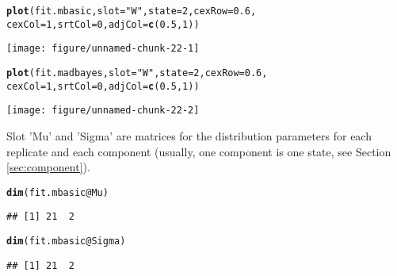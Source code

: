 \documentclass[a4paper,10pt]{article}\usepackage[]{graphicx}\usepackage[]{color}
\makeatletter
\def\maxwidth{ %
  \ifdim\Gin@nat@width>\linewidth
    \linewidth
  \else
    \Gin@nat@width
  \fi
}
\newcommand{\hlnum}[1]{\textcolor[rgb]{0.686,0.059,0.569}{#1}}%
\newcommand{\hlstr}[1]{\textcolor[rgb]{0.192,0.494,0.8}{#1}}%
\newcommand{\hlopt}[1]{\textcolor[rgb]{0,0,0}{#1}}%
\newcommand{\hlstd}[1]{\textcolor[rgb]{0.345,0.345,0.345}{#1}}%
\newcommand{\hlkwc}[1]{\textcolor[rgb]{0.333,0.667,0.333}{#1}}%
\newcommand{\hlkwd}[1]{\textcolor[rgb]{0.737,0.353,0.396}{\textbf{#1}}}%
\newenvironment{kframe}{%
 \def\at@end@of@kframe{}%
 \ifinner\ifhmode%
  \def\at@end@of@kframe{\end{minipage}}%
  \begin{minipage}{\columnwidth}%
 \fi\fi%
 \def\FrameCommand##1{\hskip\@totalleftmargin \hskip-\fboxsep
 \colorbox{shadecolor}{##1}\hskip-\fboxsep
     \hskip-\linewidth \hskip-\@totalleftmargin \hskip\columnwidth}%
 \MakeFramed {\advance\hsize-\width
   \@totalleftmargin\z@ \linewidth\hsize
   \@setminipage}}%
 {\par\unskip\endMakeFramed%
 \at@end@of@kframe}
\newenvironment{knitrout}{}{} %
\makeatother
\begin{document}
\begin{knitrout}
\color{fgcolor}\begin{kframe}
\begin{alltt}
\hlkwd{plot}\hlstd{(fit.mbasic,} \hlkwc{slot} \hlstd{=} \hlstr{"W"}\hlstd{,} \hlkwc{state} \hlstd{=} \hlnum{2}\hlstd{,} \hlkwc{cexRow} \hlstd{=} \hlnum{0.6}\hlstd{,}
    \hlkwc{cexCol} \hlstd{=} \hlnum{1}\hlstd{,} \hlkwc{srtCol} \hlstd{=} \hlnum{0}\hlstd{,} \hlkwc{adjCol} \hlstd{=} \hlkwd{c}\hlstd{(}\hlnum{0.5}\hlstd{,} \hlnum{1}\hlstd{))}
\end{alltt}
\end{kframe}

{\centering \texttt{[image: figure/unnamed-chunk-22-1]} 

}


\begin{kframe}\begin{alltt}
\hlkwd{plot}\hlstd{(fit.madbayes,} \hlkwc{slot} \hlstd{=} \hlstr{"W"}\hlstd{,} \hlkwc{state} \hlstd{=} \hlnum{2}\hlstd{,} \hlkwc{cexRow} \hlstd{=} \hlnum{0.6}\hlstd{,}
    \hlkwc{cexCol} \hlstd{=} \hlnum{1}\hlstd{,} \hlkwc{srtCol} \hlstd{=} \hlnum{0}\hlstd{,} \hlkwc{adjCol} \hlstd{=} \hlkwd{c}\hlstd{(}\hlnum{0.5}\hlstd{,} \hlnum{1}\hlstd{))}
\end{alltt}
\end{kframe}

{\centering \texttt{[image: figure/unnamed-chunk-22-2]} 

}



\end{knitrout}

Slot 'Mu' and 'Sigma' are matrices for the distribution parameters for each replicate and each component (usually, one component is one state, see Section \ref{sec:component}).

\begin{knitrout}
\color{fgcolor}\begin{kframe}
\begin{alltt}
\hlkwd{dim}\hlstd{(fit.mbasic}\hlopt{@}\hlkwc{Mu}\hlstd{)}
\end{alltt}
\begin{verbatim}
## [1] 21  2
\end{verbatim}
\begin{alltt}
\hlkwd{dim}\hlstd{(fit.mbasic}\hlopt{@}\hlkwc{Sigma}\hlstd{)}
\end{alltt}
\begin{verbatim}
## [1] 21  2
\end{verbatim}
\end{kframe}
\end{knitrout}
\end{document}
